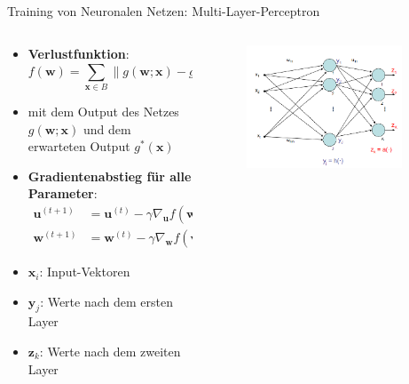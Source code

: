 \documentclass[aspectratio=1610, xcolor=dvipsnames, 9pt]{beamer}
\begin{document}
      \begin{frame}{Training von Neuronalen Netzen: Multi-Layer-Perceptron}
        \begin{columns}
          \begin{column}{0.7\textwidth}
            \begin{itemize}
              \item \textbf{Verlustfunktion}:
              \begin{equation}
                f(\mathbf{w}) = \sum_{\mathbf{x}\in B} \| g(\mathbf{w}; \mathbf{x}) - g^*(\mathbf{x}) \|^2 \quad \rightarrow \text{min}
              \end{equation} 
              \item mit dem Output des Netzes $ g(\mathbf{w};\mathbf{x}) $ und dem erwarteten Output $ g^*(\mathbf{x}) $ 
              \item \textbf{Gradientenabstieg für alle Parameter}:
              \begin{align}
                 \mathbf{u}^{(t+1)} &= \mathbf{u}^{(t)} - \gamma \nabla_{\mathbf{u}} f(\mathbf{w}^{(t)} , \mathbf{u}^{(t)}) \\
                 \mathbf{w}^{(t+1)} &= \mathbf{w}^{(t)} - \gamma \nabla_{\mathbf{w}} f(\mathbf{w}^{(t)} , \mathbf{u}^{(t)})
              \end{align}
              \item $\mathbf{x}_i$: Input-Vektoren 
              \item $\mathbf{y}_j$: Werte nach dem ersten Layer
              \item $\mathbf{z}_k$: Werte nach dem zweiten Layer
            \end{itemize}
          \end{column}
          \begin{column}{0.3\textwidth}
            \begin{figure}
              \centering
                          \includegraphics[width=0.9\textwidth]{images/MLP2.png}
              \end{figure}
          \end{column}
        \end{columns}
      \end{frame}
\end{document}
